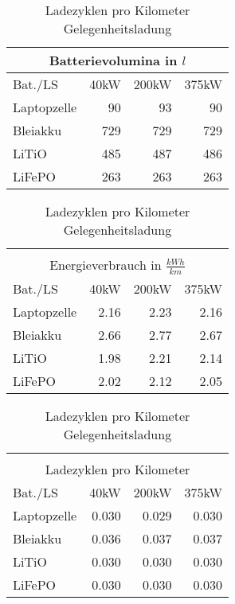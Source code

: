 \begin{table}[h!]
\begin{minipage}{0.45\textwidth}
	\end{minipage}\hfill
	\begin{minipage}{0.45\textwidth}
		\centering
		\begin{tabular}{lrrr}
			\multicolumn{4}{c}{Batterievolumina in $l$} \\ \toprule
			Bat./LS     & 40kW & 200kW &          375kW \\ \midrule
			Laptopzelle &   90 &    93 &             90 \\
			Bleiakku    &  729 &   729 &            729 \\
			LiTiO       &  485 &   487 &            486 \\
			LiFePO      &  263 &   263 &            263 \\ \bottomrule
		\end{tabular}
		\caption{Batterievolumina Gelegenheitsladung}
		
		\begin{tabular}{lrrr}
			 & & & \\
			\multicolumn{4}{c}{Energieverbrauch in $\frac{kWh}{km}$} \\ \toprule
			Bat./LS     & 40kW & 200kW &                       375kW \\ \midrule
			Laptopzelle & 2.16 &  2.23 &                        2.16 \\
			Bleiakku    & 2.66 &  2.77 &                        2.67 \\
			LiTiO       & 1.98 &  2.21 &                        2.14 \\
			LiFePO      & 2.02 &  2.12 &                        2.05 \\ \bottomrule
		\end{tabular} 
		\caption{Energieverbrauch Gelegenheitsladung}
		
		\begin{tabular}{lrrr}
			 & & & \\
			\multicolumn{4}{c}{Ladezyklen pro Kilometer} \\ \toprule
			Bat./LS     &  40kW & 200kW &          375kW \\ \midrule
			Laptopzelle & 0.030 & 0.029 &          0.030 \\
			Bleiakku    & 0.036 & 0.037 &          0.037 \\
			LiTiO       & 0.030 & 0.030 &          0.030 \\
			LiFePO      & 0.030 & 0.030 &          0.030 \\ \bottomrule
		\end{tabular} 
		\caption{Ladezyklen pro Kilometer Gelegenheitsladung}	
		
	\end{minipage}
	
	
\end{table}

